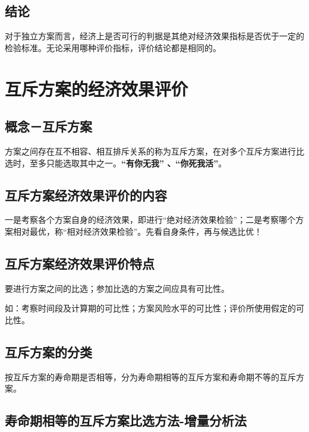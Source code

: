\subsection{结论}
对于独立方案而言，经济上是否可行的判据是其绝对经济效果指标是否优于一定的检验标准。无论采用哪种评价指标，评价结论都是相同的。

\section{互斥方案的经济效果评价}
\subsection{概念－互斥方案}
方案之间存在互不相容、相互排斥关系的称为互斥方案，在对多个互斥方案进行比选时，至多只能选取其中之一。\textbf{“有你无我” 、“你死我活”}。
\subsection{互斥方案经济效果评价的内容}
一是考察各个方案自身的经济效果，即进行“绝对经济效果检验”；二是考察哪个方案相对最优，称“相对经济效果检验”。先看自身条件，再与候选比优！
\subsection{互斥方案经济效果评价特点}
要进行方案之间的比选；参加比选的方案之间应具有可比性。

如：考察时间段及计算期的可比性；方案风险水平的可比性；评价所使用假定的可比性。

\subsection{互斥方案的分类}
按互斥方案的寿命期是否相等，分为寿命期相等的互斥方案和寿命期不等的互斥方案。

\subsection{寿命期相等的互斥方案比选方法-增量分析法}

